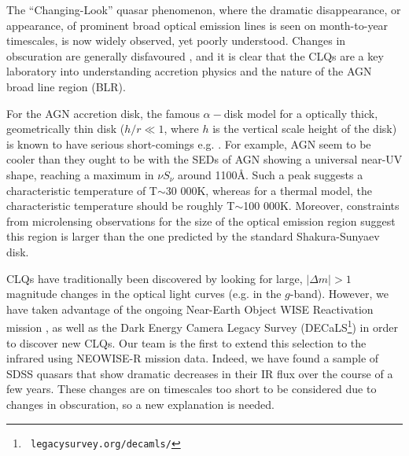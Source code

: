 \documentclass{nature}
\begin{document}
The ``Changing-Look'' quasar phenomenon, where the dramatic
disappearance, or appearance, of prominent broad optical emission
lines is seen on month-to-year timescales, is now widely observed,
\cite{LaMassa2015, MacLeod2016, Runnoe2016, Ruan2016, Gezari2017,
Rumbaugh2017} yet poorly understood. Changes in obscuration are
generally disfavoured \cite{Hutsemekers2017, Sheng2017}, and it is
clear that the CLQs are a key laboratory into understanding accretion
physics and the nature of the AGN broad line region (BLR).

For the AGN accretion disk, the famous $\alpha-$disk model \cite{SS73}
for a optically thick, geometrically thin disk ($h / r \ll 1$, where
$h$ is the vertical scale height of the disk) is known to have serious
short-comings e.g.  \cite{Antonucci1999,
Koratkar_Blaes1999,Lawrence2012}.  For example, AGN seem to be cooler
than they ought to be \cite[e.g., ][]{Lawrence2012} with the SEDs of
AGN showing a universal near-UV shape, reaching a maximum in $\nu
S_{\nu}$ around 1100\AA.  Such a peak suggests a characteristic
temperature of T$\sim$30 000K, whereas for a thermal model, the 
characteristic temperature should be roughly T$\sim$100
000K. Moreover, constraints from microlensing observations for the
size of the optical emission region \cite[e.g.,][]{Pooley2007,
Morgan2010, Morgan2012, Mosquera2011} suggest this region is larger
than the one predicted by the standard Shakura-Sunyaev disk.

CLQs have traditionally been discovered by looking for large, $|
\Delta m | >1$ magnitude changes in the optical light curves (e.g. in
the $g$-band). However, we have taken advantage of the ongoing
Near-Earth Object WISE Reactivation mission \cite[NEOWISE-R;
][]{Mainzer2014, Meisner2017a, Meisner2017b}, as well as the Dark
Energy Camera Legacy Survey (DECaLS\footnote{{\tt
legacysurvey.org/decamls/}}) in order to discover new CLQs. Our team
is the first to extend this selection to the infrared using NEOWISE-R
mission data. Indeed, we have found a sample of SDSS quasars that show
dramatic decreases in their IR flux over the course of a few
years. These changes are on timescales too short to be considered due
to changes in obscuration, so a new explanation is needed.
\end{document}
